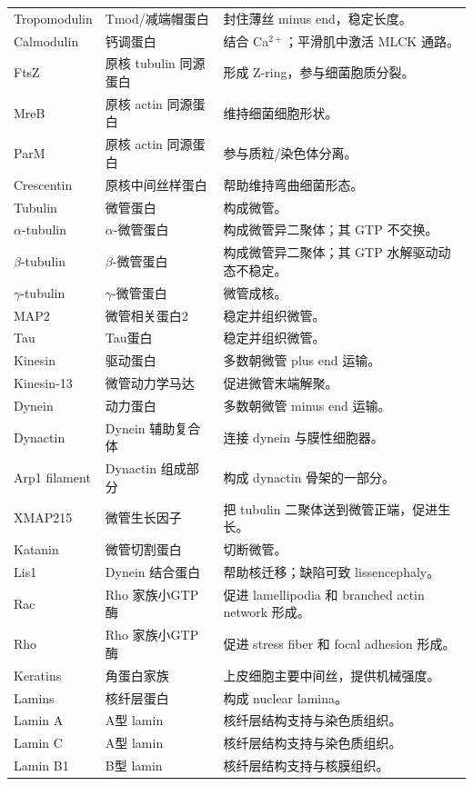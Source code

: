 \documentclass[11pt,fontset=none]{ctexart}
\begin{document}
\begin{longtable}{L{3.2cm} L{3.8cm} L{8.5cm}}
Tropomodulin & Tmod/减端帽蛋白 & 封住薄丝 minus end，稳定长度。 \\
Calmodulin & 钙调蛋白 & 结合 Ca$^{2+}$；平滑肌中激活 MLCK 通路。 \\
FtsZ & 原核 tubulin 同源蛋白 & 形成 Z-ring，参与细菌胞质分裂。 \\
MreB & 原核 actin 同源蛋白 & 维持细菌细胞形状。 \\
ParM & 原核 actin 同源蛋白 & 参与质粒/染色体分离。 \\
Crescentin & 原核中间丝样蛋白 & 帮助维持弯曲细菌形态。 \\
Tubulin & 微管蛋白 & 构成微管。 \\
$\alpha$-tubulin & $\alpha$-微管蛋白 & 构成微管异二聚体；其 GTP 不交换。 \\
$\beta$-tubulin & $\beta$-微管蛋白 & 构成微管异二聚体；其 GTP 水解驱动动态不稳定。 \\
$\gamma$-tubulin & $\gamma$-微管蛋白 & 微管成核。 \\
MAP2 & 微管相关蛋白2 & 稳定并组织微管。 \\
Tau & Tau蛋白 & 稳定并组织微管。 \\
Kinesin & 驱动蛋白 & 多数朝微管 plus end 运输。 \\
Kinesin-13 & 微管动力学马达 & 促进微管末端解聚。 \\
Dynein & 动力蛋白 & 多数朝微管 minus end 运输。 \\
Dynactin & Dynein 辅助复合体 & 连接 dynein 与膜性细胞器。 \\
Arp1 filament & Dynactin 组成部分 & 构成 dynactin 骨架的一部分。 \\
XMAP215 & 微管生长因子 & 把 tubulin 二聚体送到微管正端，促进生长。 \\
Katanin & 微管切割蛋白 & 切断微管。 \\
Lis1 & Dynein 结合蛋白 & 帮助核迁移；缺陷可致 lissencephaly。 \\
Rac & Rho 家族小GTP酶 & 促进 lamellipodia 和 branched actin network 形成。 \\
Rho & Rho 家族小GTP酶 & 促进 stress fiber 和 focal adhesion 形成。 \\
Keratins & 角蛋白家族 & 上皮细胞主要中间丝，提供机械强度。 \\
Lamins & 核纤层蛋白 & 构成 nuclear lamina。 \\
Lamin A & A型 lamin & 核纤层结构支持与染色质组织。 \\
Lamin C & A型 lamin & 核纤层结构支持与染色质组织。 \\
Lamin B1 & B型 lamin & 核纤层结构支持与核膜组织。 \\

\end{longtable}
\end{document}
